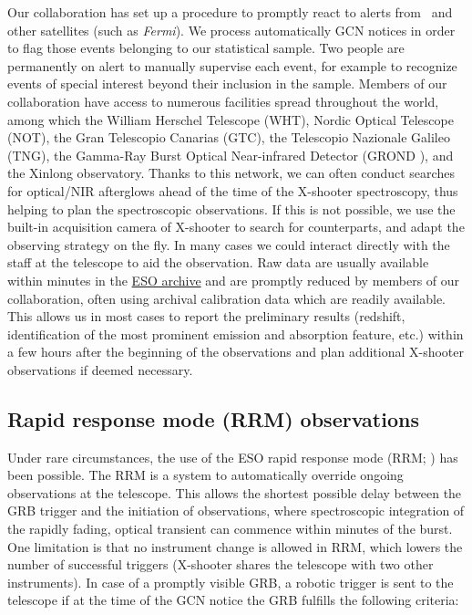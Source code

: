 \documentclass[longauth]{aa}    %
\begin{document}
Our collaboration has set up a procedure to promptly react to alerts from
\swift~and other satellites (such as \textit{Fermi}). We process automatically
GCN notices in order to flag those events belonging to our statistical sample.
Two people are permanently on alert to manually supervise each event, for
example to recognize events of special interest beyond their inclusion in the
sample. Members of our collaboration have access to numerous facilities spread
throughout the world, among which the William Herschel Telescope (WHT), Nordic
Optical Telescope (NOT), the Gran Telescopio Canarias (GTC), the Telescopio
Nazionale Galileo (TNG), the Gamma-Ray Burst Optical Near-infrared Detector
(GROND \citealt{Greiner2008}), and the Xinlong observatory. Thanks to this
network, we can often conduct searches for optical/NIR afterglows ahead of the
time of the X-shooter spectroscopy, thus helping to plan the spectroscopic
observations. If this is not possible, we use the built-in acquisition camera of
X-shooter to search for counterparts, and adapt the observing strategy on the
fly. In many cases we could interact directly with the staff at the telescope to
aid the observation. Raw data are usually available within minutes in the
\href{http://archive.eso.org/wdb/wdb/eso/xshooter/form}{ESO archive} and are
promptly reduced by members of our collaboration, often using archival
calibration data which are readily available. This allows us in most cases to
report the preliminary results (redshift, identification of the most prominent
emission and absorption feature, etc.) within a few hours after the beginning of
the observations and plan additional X-shooter observations if deemed necessary.

\subsection{Rapid response mode (RRM) observations} \label{RRM}

Under rare circumstances, the use of the ESO rapid response mode (RRM;
\citealt{Vreeswijk2010}) has been possible. The RRM is a system to automatically
override ongoing observations at the telescope. This allows the shortest
possible delay between the GRB trigger and the initiation of observations, where
spectroscopic integration of the rapidly fading, optical transient can commence
within minutes of the burst. One limitation is that no instrument change is
allowed in RRM, which lowers the number of successful triggers (X-shooter shares the telescope with two other instruments). In case of a promptly visible GRB, a robotic
trigger is sent to the telescope if at the time of the GCN notice the GRB
fulfills the following criteria:
\end{document}
